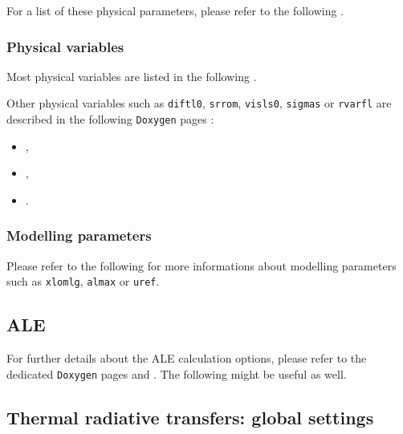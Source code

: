 For a list of these physical parameters, please refer to the following
.

\subsubsection{Physical variables}

Most physical variables are listed in the following
.

Other physical variables such as \texttt{diftl0}, \texttt{srrom},
\texttt{visls0}, \texttt{sigmas} or \texttt{rvarfl} are described in the following
\texttt{Doxygen} pages :
\begin{itemize}
\item {},
\item {},
\item {}.
\end{itemize}

\subsubsection{Modelling parameters}

Please refer to the following
 for
more informations about modelling parameters such as \texttt{xlomlg},
\texttt{almax} or \texttt{uref}.

\subsection{ALE}

For further details about the ALE calculation options,
please refer to the dedicated \texttt{Doxygen} pages
 and
. The following
 might be useful as well.

\subsection{Thermal radiative transfers: global settings}

